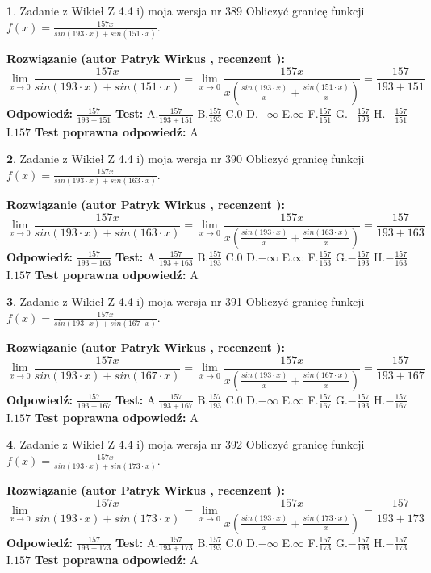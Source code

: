 \documentclass[12pt, a4paper]{article}
\theoremstyle{definition} %
\newtheorem{zad}{}
\newcommand{\zadStart}[1]{\begin{zad}#1\newline}
\newcommand{\zadStop}{\end{zad}}
\newcommand{\rozwStart}[2]{\noindent \textbf{Rozwiązanie (autor #1 , recenzent #2): }\newline}
\newcommand{\rozwStop}{\newline}
\newcommand{\odpStart}{\noindent \textbf{Odpowiedź:}\newline}
\newcommand{\odpStop}{\newline}
\newcommand{\testStart}{\noindent \textbf{Test:}\newline}
\newcommand{\testStop}{\newline}
\newcommand{\kluczStart}{\noindent \textbf{Test poprawna odpowiedź:}\newline}
\newcommand{\kluczStop}{\newline}
\begin{document}
\zadStart{Zadanie z Wikieł Z 4.4 i) moja wersja nr 389}
Obliczyć granicę funkcji $f(x)=\frac{157x}{sin(193\cdot x) +sin(151\cdot x)}$.
\zadStop
\rozwStart{Patryk Wirkus}{}
$$\lim\limits_{x\to 0}\frac{157x}{sin(193\cdot x) +sin(151\cdot x)}=\lim\limits_{x\to 0}\frac{157x}{x(\frac{sin(193\cdot x)}{x}+\frac{sin(151\cdot x)}{x})}=\frac{157}{193+151}$$
\rozwStop
\odpStart
$\frac{157}{193+151}$
\odpStop
\testStart
A.$\frac{157}{193+151}$
B.$\frac{157}{193}$
C.$0$
D.$-\infty$
E.$\infty$
F.$\frac{157}{151}$
G.$-\frac{157}{193}$
H.$-\frac{157}{151}$
I.$157$
\testStop
\kluczStart
A
\kluczStop



\zadStart{Zadanie z Wikieł Z 4.4 i) moja wersja nr 390}
Obliczyć granicę funkcji $f(x)=\frac{157x}{sin(193\cdot x) +sin(163\cdot x)}$.
\zadStop
\rozwStart{Patryk Wirkus}{}
$$\lim\limits_{x\to 0}\frac{157x}{sin(193\cdot x) +sin(163\cdot x)}=\lim\limits_{x\to 0}\frac{157x}{x(\frac{sin(193\cdot x)}{x}+\frac{sin(163\cdot x)}{x})}=\frac{157}{193+163}$$
\rozwStop
\odpStart
$\frac{157}{193+163}$
\odpStop
\testStart
A.$\frac{157}{193+163}$
B.$\frac{157}{193}$
C.$0$
D.$-\infty$
E.$\infty$
F.$\frac{157}{163}$
G.$-\frac{157}{193}$
H.$-\frac{157}{163}$
I.$157$
\testStop
\kluczStart
A
\kluczStop



\zadStart{Zadanie z Wikieł Z 4.4 i) moja wersja nr 391}
Obliczyć granicę funkcji $f(x)=\frac{157x}{sin(193\cdot x) +sin(167\cdot x)}$.
\zadStop
\rozwStart{Patryk Wirkus}{}
$$\lim\limits_{x\to 0}\frac{157x}{sin(193\cdot x) +sin(167\cdot x)}=\lim\limits_{x\to 0}\frac{157x}{x(\frac{sin(193\cdot x)}{x}+\frac{sin(167\cdot x)}{x})}=\frac{157}{193+167}$$
\rozwStop
\odpStart
$\frac{157}{193+167}$
\odpStop
\testStart
A.$\frac{157}{193+167}$
B.$\frac{157}{193}$
C.$0$
D.$-\infty$
E.$\infty$
F.$\frac{157}{167}$
G.$-\frac{157}{193}$
H.$-\frac{157}{167}$
I.$157$
\testStop
\kluczStart
A
\kluczStop



\zadStart{Zadanie z Wikieł Z 4.4 i) moja wersja nr 392}
Obliczyć granicę funkcji $f(x)=\frac{157x}{sin(193\cdot x) +sin(173\cdot x)}$.
\zadStop
\rozwStart{Patryk Wirkus}{}
$$\lim\limits_{x\to 0}\frac{157x}{sin(193\cdot x) +sin(173\cdot x)}=\lim\limits_{x\to 0}\frac{157x}{x(\frac{sin(193\cdot x)}{x}+\frac{sin(173\cdot x)}{x})}=\frac{157}{193+173}$$
\rozwStop
\odpStart
$\frac{157}{193+173}$
\odpStop
\testStart
A.$\frac{157}{193+173}$
B.$\frac{157}{193}$
C.$0$
D.$-\infty$
E.$\infty$
F.$\frac{157}{173}$
G.$-\frac{157}{193}$
H.$-\frac{157}{173}$
I.$157$
\testStop
\kluczStart
A
\kluczStop
\end{document}
